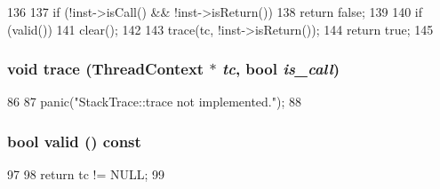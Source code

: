 \begin{DoxyCode}
136 {
137     if (!inst->isCall() && !inst->isReturn())
138         return false;
139 
140     if (valid())
141         clear();
142 
143     trace(tc, !inst->isReturn());
144     return true;
145 }
\end{DoxyCode}
\hypertarget{classPowerISA_1_1StackTrace_a46d6b95a2e5fdb75702cf45e39566645}{
\subsubsection[{trace}]{\setlength{\rightskip}{0pt plus 5cm}void trace ({\bf ThreadContext} $\ast$ {\em tc}, \/  bool {\em is\_\-call})}}
\label{classPowerISA_1_1StackTrace_a46d6b95a2e5fdb75702cf45e39566645}



\begin{DoxyCode}
86 {
87     panic("StackTrace::trace not implemented.\n");
88 }
\end{DoxyCode}
\hypertarget{classPowerISA_1_1StackTrace_a8d985300b138b6c5556ab17ed4df3b38}{
\subsubsection[{valid}]{\setlength{\rightskip}{0pt plus 5cm}bool valid () const}}
\label{classPowerISA_1_1StackTrace_a8d985300b138b6c5556ab17ed4df3b38}



\begin{DoxyCode}
97     {
98         return tc != NULL;
99     }
\end{DoxyCode}


